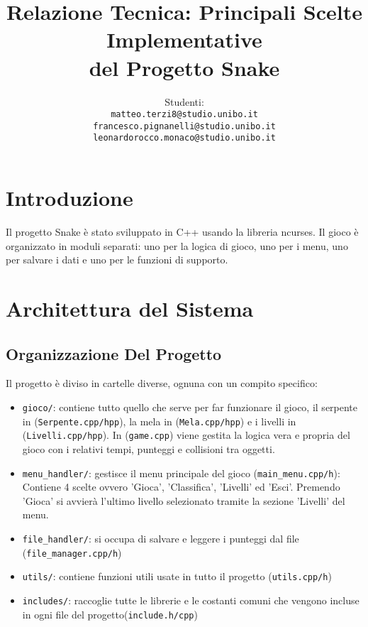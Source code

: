 \documentclass[a4paper,12pt]{article}
\title{Relazione Tecnica: Principali Scelte Implementative\\del Progetto Snake}
\author{Studenti:\\ 
\texttt{matteo.terzi8@studio.unibo.it}\\ 
\texttt{francesco.pignanelli@studio.unibo.it}\\ 
\texttt{leonardorocco.monaco@studio.unibo.it}
}
\date{}
\begin{document}
\sloppy

\maketitle

\section{Introduzione}

Il progetto Snake è stato sviluppato in C++ usando la libreria ncurses. Il gioco è organizzato in moduli separati: uno per la logica di gioco, uno per i menu, uno per salvare i dati e uno per le funzioni di supporto.

\section{Architettura del Sistema}

\subsection{Organizzazione Del Progetto}

Il progetto è diviso in cartelle diverse, ognuna con un compito specifico:

\begin{itemize}
    \item \texttt{gioco/}: contiene tutto quello che serve per far funzionare il gioco, il serpente in (\texttt{Serpente.cpp/hpp}), la mela in (\texttt{Mela.cpp/hpp}) e i livelli in (\texttt{Livelli.cpp/hpp}). In (\texttt{game.cpp}) viene gestita la logica vera e propria del gioco con i relativi tempi, punteggi e collisioni tra oggetti.
    
    \item \texttt{menu\_handler/}: gestisce il menu principale del gioco (\texttt{main\_menu.cpp/h}): Contiene 4 scelte ovvero 'Gioca', 'Classifica', 'Livelli' ed 'Esci'. Premendo 'Gioca' si avvierà l'ultimo livello selezionato tramite la sezione 'Livelli' del menu.
    
    \item \texttt{file\_handler/}: si occupa di salvare e leggere i punteggi dal file (\texttt{file\_manager.cpp/h})
    
    \item \texttt{utils/}: contiene funzioni utili usate in tutto il progetto (\texttt{utils.cpp/h})
    \item \texttt{includes/}: raccoglie tutte le librerie e le costanti comuni che vengono incluse in ogni file del progetto(\texttt{include.h/cpp})
\end{itemize}
\end{document}
